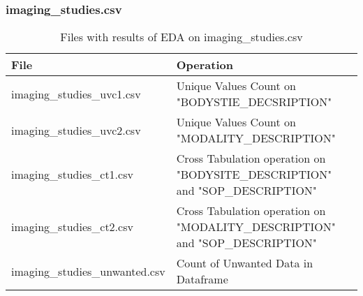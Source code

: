 \documentclass[12pt, twosided]{report}  %
\begin{document}
\subsubsection{imaging\_studies.csv}

\begin{table}[H]
	\centering
	\begin{tabular}{p{5.5cm}|p{14cm}}
		\textbf{File}                  & \textbf{Operation} \\ \hline
		imaging\_studies\_uvc1.csv     & Unique Values Count on "BODYSTIE\_DECSRIPTION" \\
		imaging\_studies\_uvc2.csv     & Unique Values Count on "MODALITY\_DESCRIPTION" \\
		imaging\_studies\_ct1.csv      & Cross Tabulation operation on "BODYSITE\_DESCRIPTION" and "SOP\_DESCRIPTION" \\
		imaging\_studies\_ct2.csv      & Cross Tabulation operation on "MODALITY\_DESCRIPTION" and "SOP\_DESCRIPTION" \\
		imaging\_studies\_unwanted.csv & Count of Unwanted Data in Dataframe
	\end{tabular}
	\caption{Files with results of EDA on imaging\_studies.csv}
\end{table}
\end{document}
